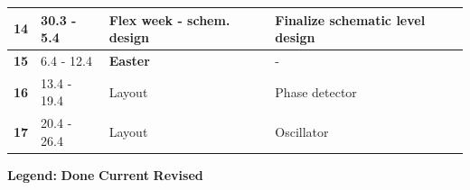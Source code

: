 \documentclass[t, screen, aspectratio=43]{beamer}
\begin{document}
\begin{frame}
\begin{table}[htb!]
\begin{tabular}{|c|l|l|l|}
			\hline 
			\rule[-1ex]{0pt}{2.5ex}\textbf{14}& 30.3 - 5.4 &  Flex week - schem. design & Finalize schematic level design\\ 
			\hline 
			\rule[-1ex]{0pt}{2.5ex}\textbf{15}& 6.4 - 12.4& {\color{red}\textbf{Easter}} & - \\ 
			\hline 
			\rule[-1ex]{0pt}{2.5ex}\textbf{16}& 13.4 - 19.4& Layout & Phase detector\\ 
			\hline 
			\rule[-1ex]{0pt}{2.5ex}\textbf{17}& 20.4 - 26.4& Layout & Oscillator\\ 
			\hline 
		\end{tabular}
		\begin{flushleft}\textbf{Legend:} \colorbox{red!20}{\textbf{Done}} \colorbox{green!20}{\textbf{Current}}  \colorbox{blue!20}{\textbf{Revised}}
		\end{flushleft}
	\end{table}   
\end{frame}
\end{document}
